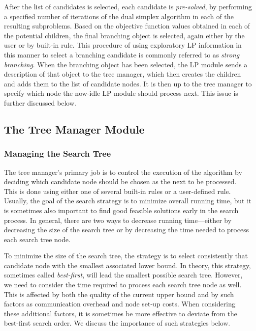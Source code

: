 After the list of candidates is selected, each candidate is {\em
pre-solved}, by performing a specified number of iterations of the
dual simplex algorithm in each of the resulting subproblems. Based on
the objective function values obtained in each of the potential
children, the final branching object is selected, again either by the
user or by built-in rule. This procedure of using exploratory LP
information in this manner to select a branching candidate is commonly
referred to as {\em strong branching}. When the branching object has
been selected, the LP module sends a description of that object to the
tree manager, which then creates the children and adds them to the
list of candidate nodes. It is then up to the tree manager to specify
which node the now-idle LP module should process next. This issue is
further discussed below.

\subsection{The Tree Manager Module}
\label{tree-management}

\subsubsection{Managing the Search Tree}

The tree manager's primary job is to control the execution of the
algorithm by deciding which candidate node should be chosen as the
next to be processed. This is done using either one of several
built-in rules or a user-defined rule. Usually, the goal of the search
strategy is to minimize overall running time, but it is sometimes
also important to find good feasible solutions early in the search
process. In general, there are two ways to decrease running
time---either by decreasing the size of the search tree or by
decreasing the time needed to process each search tree node.

To minimize the size of the search tree, the strategy is to select
consistently that candidate node with the smallest associated lower bound.
In theory, this strategy, sometimes called {\em best-first}, will lead
the smallest possible search tree. However, we need to consider the
time required to process each search tree node as well. This is affected
by both the quality of the current upper bound and by such factors as
communication overhead and node set-up costs. When considering these
additional factors, it is sometimes be more effective to deviate from the
best-first search order. We discuss the importance of such strategies
below.

